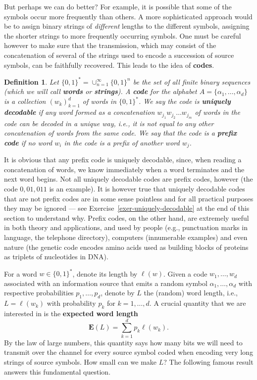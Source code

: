 \documentclass[12pt]{article}
\newtheorem{defi}[thm]{Definition}
\newcommand{\expec}{\mathbf{E}}
\theoremstyle{example}
\begin{document}
But perhaps we can do better? For example, it is possible that some of the symbols occur more frequently than others. A more sophisticated approach would be to assign binary strings of \emph{different} lengths to the different symbols, assigning the shorter strings to more frequently occurring symbols. One must be careful however to make sure that the transmission, which may consist of the concatenation of several of the strings used to encode a succession of source symbols, can be faithfully recovered. This leads to the idea of \textbf{codes}.

\begin{defi} Let $\{0,1\}^*=\cup_{n=1}^\infty \{0,1\}^n$ be the set of all finite binary sequences (which we will call \textbf{words} or \textbf{strings}). A \textbf{code} for the alphabet $A=\{ \alpha_1,\ldots,\alpha_d\}$ is a collection $(w_k)_{k=1}^d$ of words in $\{0,1\}^*$. We say the code is \textbf{uniquely decodable} if any word formed as a concatenation
$w_{j_1}w_{j_2}\ldots w_{j_m}$
of words in the code can be decoded in a unique way, i.e., it is not equal to any other concatenation of words from the same code. We say that the code is a \textbf{prefix code} if no word $w_i$ in the code is a prefix of another word $w_j$. 
\end{defi}

It is obvious that any prefix code is uniquely decodable, since, when reading a concatenation of words, we know immediately when a word terminates and the next word begins. Not all uniquely decodable codes are prefix codes, however (the code $0, 01, 011$ is an example). It is however true that uniquely decodable codes that are not prefix codes are in some sense pointless and for all practical purposes they may be ignored --- see Exercise~\ref{exer-uniquely-decodable} at the end of this section to understand why. Prefix codes, on the other hand, are extremely useful in both theory and applications, and used by people (e.g., punctuation marks in language, the telephone directory), computers (innumerable examples) and even nature (the genetic code encodes amino acids used as building blocks of proteins as triplets of nucleotides in DNA).

For a word $w\in \{0,1\}^*$, denote its length by $\ell(w)$. Given a code $w_1,\ldots,w_d$ associated with an information source that emits a random symbol $\alpha_1,\ldots,\alpha_d$ with respective probabilities $p_1,\ldots,p_d$, denote by $L$ the (random) word length, i.e., $L=\ell(w_k)$ with probability $p_k$ for $k=1,\ldots,d$. A crucial quantity that we are interested in is the \textbf{expected word length}
$$ \expec(L) = \sum_{k=1}^d p_k \ell(w_k). $$
By the law of large numbers, this quantity says how many bits we will need to transmit over the channel for every source symbol coded when encoding very long strings of source symbols. How small can we make $L$? The following famous result answers this fundamental question.
\end{document}
